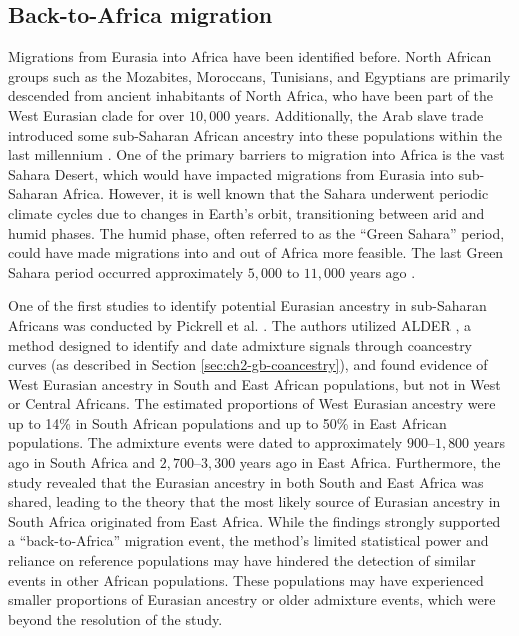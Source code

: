 \subsection{Back-to-Africa migration}
\label{sec:ch3-back-to-africa}


Migrations from Eurasia into Africa have been identified before. 
%
North African groups such as the Mozabites, Moroccans, Tunisians, and Egyptians are primarily descended from ancient inhabitants of North Africa, who have been part of the West Eurasian clade for over $10{,}000$ years. Additionally, the Arab slave trade introduced some sub-Saharan African ancestry into these populations within the last millennium \cite{price2009sensitive, hellenthal2014genetic, salter2019fine}.
%
One of the primary barriers to migration into Africa is the vast Sahara Desert, which would have impacted migrations from Eurasia into sub-Saharan Africa.
%
However, it is well known that the Sahara underwent periodic climate cycles due to changes in Earth's orbit, transitioning between arid and humid phases. 
%
The humid phase, often referred to as the ``Green Sahara'' period, could have made migrations into and out of Africa more feasible. The last Green Sahara period occurred approximately $5{,}000$ to $11{,}000$ years ago \cite{tierney2017rainfall, larrasoana2013dynamics}.

One of the first studies to identify potential Eurasian ancestry in sub-Saharan Africans was conducted by Pickrell et al. \cite{pickrell2012genetic, pickrell2014ancient}. The authors utilized ALDER \cite{loh2013inferring}, a method designed to identify and date admixture signals through coancestry curves (as described in Section \ref{sec:ch2-gb-coancestry}), and found evidence of West Eurasian ancestry in South and East African populations, but not in West or Central Africans. The estimated proportions of West Eurasian ancestry were up to 14\% in South African populations and up to 50\% in East African populations. The admixture events were dated to approximately $900$--$1{,}800$ years ago in South Africa and $2{,}700$--$3{,}300$ years ago in East Africa. Furthermore, the study revealed that the Eurasian ancestry in both South and East Africa was shared, leading to the theory that the most likely source of Eurasian ancestry in South Africa originated from East Africa. While the findings strongly supported a ``back-to-Africa'' migration event, the method’s limited statistical power and reliance on reference populations may have hindered the detection of similar events in other African populations. These populations may have experienced smaller proportions of Eurasian ancestry or older admixture events, which were beyond the resolution of the study.

